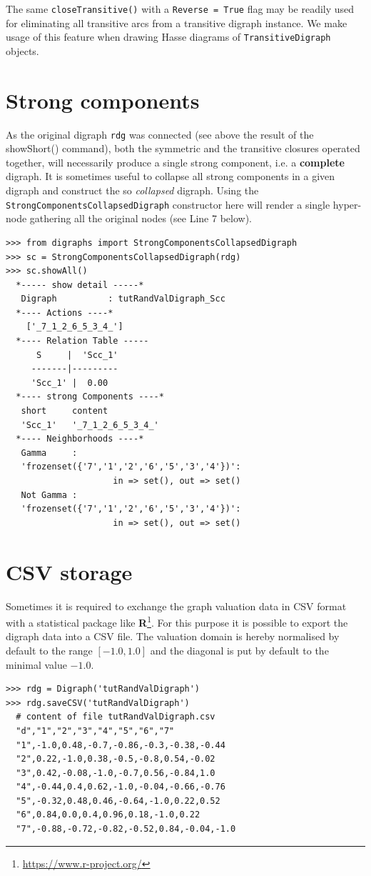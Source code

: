 The same \texttt{closeTransitive()} with a \texttt{Reverse = True} flag may be readily used for eliminating all transitive arcs from a transitive digraph instance. We make usage of this feature when drawing Hasse diagrams of \texttt{TransitiveDi\-graph} objects.

\section{Strong components}
\label{sec:2.8}

As the original digraph \texttt{rdg} was connected (see above the result of the showShort() command), both the symmetric and the transitive closures operated together, will necessarily produce a single strong component, i.e. a \textbf{complete} digraph. It is sometimes useful to collapse all strong components in a given digraph and construct the so \emph{collapsed} digraph. Using the \texttt{StrongComponentsCollapsedDigraph} constructor  here will render a single hyper-node gathering all the original nodes (see Line 7 below).
\begin{lstlisting}[caption={Computing the strong components in a digraph},label=list:2.10]
>>> from digraphs import StrongComponentsCollapsedDigraph
>>> sc = StrongComponentsCollapsedDigraph(rdg)
>>> sc.showAll()
  *----- show detail -----*
   Digraph          : tutRandValDigraph_Scc
  *---- Actions ----*
    ['_7_1_2_6_5_3_4_']
  *---- Relation Table -----
      S     |  'Scc_1'	  
     -------|---------
     'Scc_1' |  0.00
  *---- strong Components ----*
   short 	 content
   'Scc_1' 	 '_7_1_2_6_5_3_4_'
  *---- Neighborhoods ----*
   Gamma     :
   'frozenset({'7','1','2','6','5','3','4'})':
                     in => set(), out => set()
   Not Gamma :
   'frozenset({'7','1','2','6','5','3','4'})':
                     in => set(), out => set()
\end{lstlisting}
  
\section{CSV storage}
\label{sec:2.9}

Sometimes it is required to exchange the graph valuation data in CSV format with a statistical package like \textbf{R}\footnote{\url{https://www.r-project.org/}}. For this purpose it is possible to export the digraph data into a CSV file. The valuation domain is hereby normalised by default to the range $[-1.0,1.0]$ and the diagonal is put by default to the minimal value $-1.0$.
\begin{lstlisting}
>>> rdg = Digraph('tutRandValDigraph')
>>> rdg.saveCSV('tutRandValDigraph')
  # content of file tutRandValDigraph.csv
  "d","1","2","3","4","5","6","7"
  "1",-1.0,0.48,-0.7,-0.86,-0.3,-0.38,-0.44
  "2",0.22,-1.0,0.38,-0.5,-0.8,0.54,-0.02
  "3",0.42,-0.08,-1.0,-0.7,0.56,-0.84,1.0
  "4",-0.44,0.4,0.62,-1.0,-0.04,-0.66,-0.76
  "5",-0.32,0.48,0.46,-0.64,-1.0,0.22,0.52
  "6",0.84,0.0,0.4,0.96,0.18,-1.0,0.22
  "7",-0.88,-0.72,-0.82,-0.52,0.84,-0.04,-1.0
\end{lstlisting}
  

